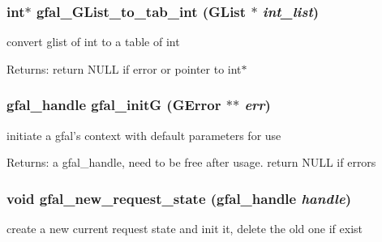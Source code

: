 \subsubsection{\setlength{\rightskip}{0pt plus 5cm}int$\ast$ gfal\_\-GList\_\-to\_\-tab\_\-int (GList $\ast$ {\em int\_\-list})}\label{gfal__common__internal_8h_87219c9e2c6323b67c2ac70354ee2645}


convert glist of int to a table of int 

\begin{Desc}
\item[Returns:]return NULL if error or pointer to int$\ast$ \end{Desc}
\subsubsection{\setlength{\rightskip}{0pt plus 5cm}gfal\_\-handle gfal\_\-init\-G (GError $\ast$$\ast$ {\em err})}\label{gfal__common__internal_8h_8410ba458f920d8f8a8f0e5594170fe4}


initiate a gfal's context with default parameters for use \begin{Desc}
\item[Returns:]a gfal\_\-handle, need to be free after usage. return NULL if errors \end{Desc}
\subsubsection{\setlength{\rightskip}{0pt plus 5cm}void gfal\_\-new\_\-request\_\-state (gfal\_\-handle {\em handle})}\label{gfal__common__internal_8h_3453c8a22faa54f7bf3278d5ecd7785d}


create a new current request state and init it, delete the old one if exist 